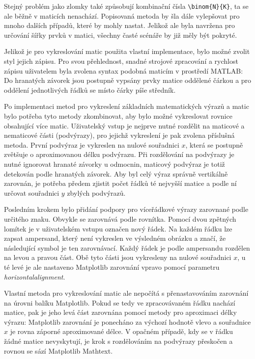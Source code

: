 \documentclass[FM]{tulthesis}
\begin{document}
	Stejný problém jako zlomky také způsobují kombinační čísla \verb|\binom{N}{K}|, ta se ale běžně v maticích nenachází. Popisovaná metoda by šla dále vylepšovat pro mnoho dalších případů, které by mohly nastat. Jelikož ale byla navržena pro určování šířky prvků v matici, všechny časté scénáře by již měly být pokryté. %

	Jelikož je pro vykreslování matic použita vlastní implementace, bylo možné zvolit styl jejich zápisu. Pro svou přehlednost, snadné strojové zpracování a rychlost zápisu uživatelem byla zvolena syntax podobná maticím v prostředí MATLAB: Do hranatých závorek jsou postupně vypsány prvky matice oddělené čárkou a pro oddělení jednotlivých řádků se místo čárky píše středník.

	Po implementaci metod pro vykreslení základních matematických výrazů a matic bylo potřeba tyto metody zkombinovat, aby bylo možné vykreslovat rovnice obsahující více matic. Uživatelský vstup je nejprve nutné rozdělit na maticové a nematicové části (podvýrazy), pro jejichž vykreslení je pak zvolena příslušná metoda. První podvýraz je vykreslen na nulové souřadnici $x$, která se postupně zvětšuje o aproximovanou délku podvýrazu. Při rozdělování na podvýrazy je nutné ignorovat hranaté závorky u odmocnin, maticový podvýraz je totiž detekován podle hranatých závorek. Aby byl celý výraz správně vertikálně zarovnán, je potřeba předem zjistit počet řádků té nejvyšší matice a podle ní určovat souřadnici $y$ zbylých podvýrazů.
	
	Posledním krokem bylo přidání podpory pro víceřádkové výrazy zarovnané podle určitého znaku. Obvykle se zarovnává podle rovnítka. Pomocí dvou zpětných lomítek je v uživatelském vstupu označen nový řádek. Na každém řádku lze zapsat ampersand, který není vykreslen ve výsledném obrázku a značí, že následující symbol je ten zarovnávací. Každý řádek je podle ampersandu rozdělen na levou a pravou část. Obě tyto části jsou vykresleny na nulové souřadnici $x$, u té levé je ale nastaveno Matplotlib zarovnání vpravo pomocí parametru \textit{horizontalalignment}.
	
	Vlastní metoda pro vykreslování matic ale nepočítá s přenastavováním zarovnání na úrovni balíku Matplotlib. Pokud se tedy ve zpracovávaném řádku nachází matice, pak je jeho levá část zarovnána pomocí metody pro aproximaci délky výrazu: Matplotlib zarovnání je ponecháno za výchozí hodnotě vlevo a souřadnice $x$ je rovna záporné aproximované délce. V opačném případě, kdy se v řádku žádné matice nevyskytují, je krok s rozdělováním na podvýrazy přeskočen a rovnou se sází Matplotlib Mathtext.
	
\end{document}
